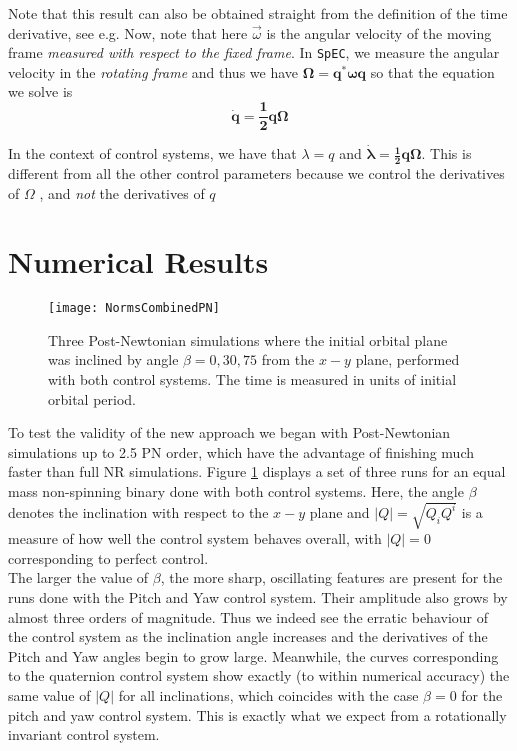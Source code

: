 \documentclass[aps, prd, amsmath, floats, floatfix, twocolumn,superscriptaddress, nofootinbib, showpacs]{revtex4-1}
\theoremstyle{plain}
\theoremstyle{definition}
\newcommand{\w}[1]{\mathbf{#1}}
\begin{document}
Note that this result can also be obtained straight from the definition of the
time derivative, see e.g. 
Now, note that here $\vec{\omega}$ is the angular velocity of the moving 
frame \emph{measured  with respect to the fixed frame}. In {\tt SpEC}, we measure the angular velocity in the \emph{rotating frame} and thus we have $\w{\Omega = q^*\omega q}$ so that the equation we solve is
\begin{equation}
  \label{Dynamics}
  \w{\dot{q}=\frac{1}{2}q\Omega}
\end{equation}

In the context of control systems, we have that $\lambda=q$ and $\w{\dot{\lambda}=\frac{1}{2}q\Omega}$. This is different from all the other control parameters because we control the derivatives of $\Omega$ , and \emph{not} the derivatives of $q$ 

\section{Numerical Results}

\begin{figure}[!h]
  \texttt{[image: NormsCombinedPN]}
  \caption{Three Post-Newtonian simulations where the initial orbital plane was inclined by  angle $\beta=0,30,75$ from the
$x-y$ plane, performed with both control systems. The time is measured in units of initial orbital period. }
  \label{fig:NormPN}
\end{figure}


To test the validity of the new approach we began with Post-Newtonian simulations
up to 2.5 PN order, which have the advantage of finishing much faster than
full NR simulations. Figure \ref{fig:NormPN} displays a set of three runs for an equal
mass non-spinning binary done with both control systems. Here, the angle $\beta$ denotes the inclination with respect to the $x-y$ plane and $|Q|=\sqrt{Q_{i}Q^{i}}$ is 
a measure of how well the control system behaves overall, with $|Q|=0$ corresponding to
perfect control. \\

The larger the value of $\beta$, the more sharp, oscillating features are present
for the runs done with the Pitch and Yaw control system. Their amplitude also grows by almost three orders of magnitude.
Thus we indeed see the erratic behaviour of the control system as the inclination angle increases and the derivatives
of the Pitch and Yaw angles begin to grow large. Meanwhile, the curves corresponding to the quaternion control system show exactly (to within numerical accuracy) the same value of $|Q|$  for all inclinations, which coincides with the case $\beta=0$ for the pitch and yaw control system. This is exactly what we expect from a rotationally invariant control system. 
\end{document}
